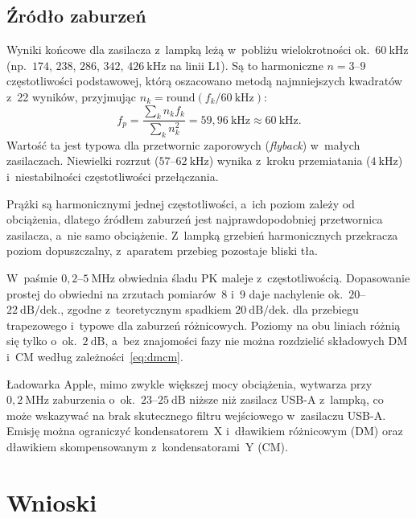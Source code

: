 \documentclass[11pt,a4paper]{article}
\begin{document}
\subsection{Źródło zaburzeń}
\label{sec:zrodlo}

Wyniki końcowe dla zasilacza z~lampką leżą w~pobliżu wielokrotności ok.~$60\ \mathrm{kHz}$
(np.\ $174$, $238$, $286$, $342$, $426\ \mathrm{kHz}$ na linii L1). Są to harmoniczne $n = 3$--$9$ częstotliwości
podstawowej, którą oszacowano metodą najmniejszych kwadratów z~22 wyników, przyjmując
$n_k = \mathrm{round}(f_k/60\ \mathrm{kHz})$:
\[
  f_p = \frac{\sum_k n_k f_k}{\sum_k n_k^2} = 59{,}96\ \mathrm{kHz} \approx 60\ \mathrm{kHz}.
\]
Wartość ta jest typowa dla przetwornic zaporowych (\emph{flyback}) w~małych zasilaczach.
Niewielki rozrzut ($57$--$62\ \mathrm{kHz}$) wynika z~kroku przemiatania ($4\ \mathrm{kHz}$) i~niestabilności
częstotliwości przełączania.

Prążki są harmonicznymi jednej częstotliwości, a~ich poziom zależy od obciążenia, dlatego
źródłem zaburzeń jest najprawdopodobniej przetwornica zasilacza, a~nie samo obciążenie. Z~lampką
grzebień harmonicznych przekracza poziom dopuszczalny, z~aparatem przebieg pozostaje bliski tła.

W~paśmie $0{,}2$--$5\ \mathrm{MHz}$ obwiednia śladu PK maleje z~częstotliwością.
Dopasowanie prostej do obwiedni na zrzutach pomiarów~8 i~9 daje nachylenie
ok.~$20$--$22\ \mathrm{dB/dek.}$, zgodne z~teoretycznym spadkiem $20\ \mathrm{dB/dek.}$ dla przebiegu
trapezowego i~typowe dla zaburzeń różnicowych. Poziomy na obu liniach różnią się tylko
o~ok.~$2\ \mathrm{dB}$, a~bez znajomości fazy nie można rozdzielić składowych DM i~CM
według zależności~\eqref{eq:dmcm}.

Ładowarka Apple, mimo zwykle większej mocy obciążenia, wytwarza przy $0{,}2\ \mathrm{MHz}$ zaburzenia
o~ok.~$23$--$25\ \mathrm{dB}$ niższe niż zasilacz USB-A z~lampką, co może wskazywać na brak skutecznego filtru wejściowego w~zasilaczu USB-A. Emisję można
ograniczyć kondensatorem~X i~dławikiem różnicowym (DM) oraz dławikiem skompensowanym
z~kondensatorami~Y (CM).

\FloatBarrier
\section{Wnioski}
\end{document}
